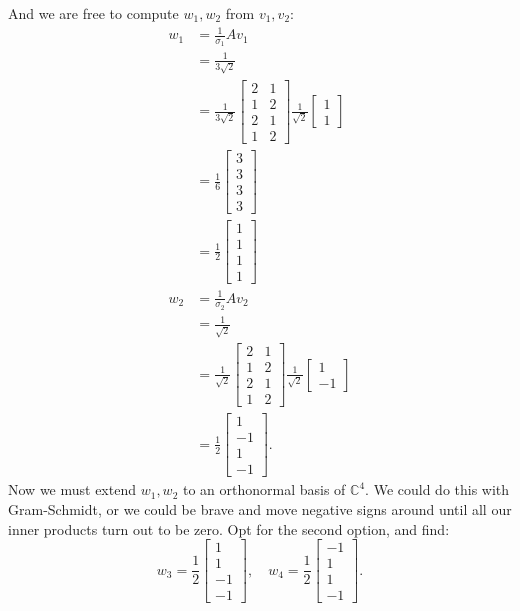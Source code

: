\documentclass{article}
\begin{document}
\begin{enumerate}
    And we are free to compute $w_1,w_2$ from $v_1,v_2$:
    \begin{align*}
        w_1&= \frac{1}{\sigma_1}Av_1 \\
        &= \frac{1}{3\sqrt{2} } \\
        &=\frac{1}{3\sqrt{2} }\begin{bmatrix} 2&1\\1&2\\2&1\\1&2\end{bmatrix}\frac{1}{\sqrt{2} }\begin{bmatrix} 1\\1 \end{bmatrix} \\
        &= \frac{1}{6}\begin{bmatrix} 3\\3\\3\\3 \end{bmatrix}  \\
        &= \frac{1}{2}\begin{bmatrix} 1\\1\\1\\1 \end{bmatrix}  \\
        w_2&= \frac{1}{\sigma_2}Av_2 \\
        &= \frac{1}{\sqrt{2} } \\
        &=\frac{1}{\sqrt{2} }\begin{bmatrix} 2&1\\1&2\\2&1\\1&2\end{bmatrix}\frac{1}{\sqrt{2} }\begin{bmatrix} 1\\-1 \end{bmatrix} \\
        &= \frac{1}{2}\begin{bmatrix} 1\\-1\\1\\-1 \end{bmatrix}
    .\end{align*}
    Now we must extend $w_1,w_2$ to an orthonormal basis of $\mathbb{C}^{4}$. We could do this with Gram-Schmidt, or we could be brave and move negative signs around until all our inner products turn out to be zero. Opt for the second option, and find:
    \[
    w_3=\frac{1}{2}\begin{bmatrix} 1\\1\\-1\\-1 \end{bmatrix},\quad w_4=\frac{1}{2}\begin{bmatrix} -1\\1\\1\\-1 \end{bmatrix} 
    .\] 


\end{enumerate}
\end{document}
